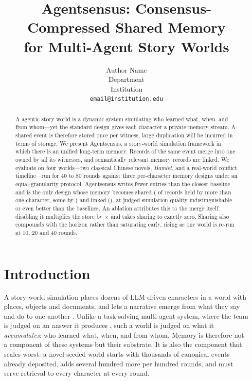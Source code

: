 \documentclass{article}
\title{Agentsensus: Consensus-Compressed Shared Memory\\for Multi-Agent Story Worlds}
\author{Author Name\\
Department\\
Institution\\
\texttt{email@institution.edu}}
\begin{document}
\maketitle

\begin{abstract}
A agentic story world is a dynamic system simulating who learned what, when, and
from whom---yet the standard design gives each character a private memory
stream. A shared event is therefore stored once per witness, large duplication will be incurred in terms of storage.
We present Agentsensus, a story-world simulation framework in which there is an unified long-term memory. Records of the same event merge into one owned by all its
witnesses, and semantically relevant memory records are linked.
We evaluate on four worlds---two classical Chinese novels, \emph{Hamlet}, and
a real-world conflict timeline---run for 40 to 80 rounds against three
per-character memory designs under an equal-granularity protocol. Agentsensus
writes \SaveRange{} fewer entries than the closest baseline and is the only
design whose memory becomes shared (\ShRange{} of records held by more than
one character, some by \MaxOwners{}) and linked (\AffRange{}), at judged
simulation quality indistinguishable or even better than the baselines. An ablation attributes this to the
merge itself: disabling it multiplies the store by \AblFactor{}$\times$ and
takes sharing to exactly zero. Sharing also compounds with the horizon rather
than saturating early, rising \RuShChain{} as one world is re-run at 10, 20
and 40 rounds.
\end{abstract}

\section{Introduction}

A story-world simulation places dozens of LLM-driven characters in a world with
places, objects and documents, and lets a narrative emerge from what they say
and do to one another \citep{park2023generative,ran2025bookworld}. Unlike a
task-solving multi-agent system, where the team is judged on an answer it
produces \citep{wu2023autogen,hong2024metagpt,qian2024chatdev}, such a world is
judged on what it \emph{accumulates}: who learned what, when, and from whom.
Memory is therefore not a component of these systems but their substrate. It is
also the component that scales worst: a novel-seeded world starts with thousands
of canonical events already deposited, adds several hundred more per hundred
rounds, and must serve retrieval to every character at every round.
\end{document}
